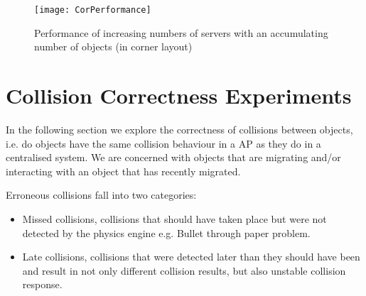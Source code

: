 \begin{figure}[!t]
	\centering
	\texttt{[image: CorPerformance]}
	\caption{Performance of increasing numbers of servers with an accumulating number of objects (in corner layout)}
	\label{fig_PerCor}
\end{figure}

\section{Collision Correctness Experiments}
In the following section we explore the correctness of collisions between objects, i.e. do objects have the same collision behaviour in a AP as they do in a centralised system. We are concerned with objects that are migrating and/or interacting with an object that has recently migrated.

Erroneous collisions fall into two categories:
\begin{itemize}
	\item Missed collisions, collisions that should have taken place but were not detected by the physics engine e.g. Bullet through paper problem.
	\item Late collisions, collisions that were detected later than they should have been and result in not only different collision results, but also unstable collision response.
\end{itemize}




